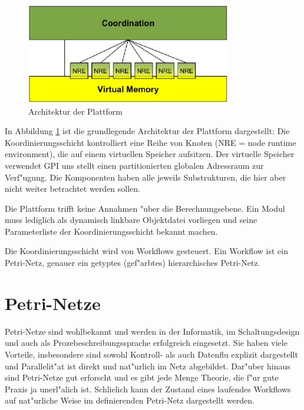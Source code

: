 \documentclass[a4paper,12pt]{article}
\newlength{\st}\setlength{\st}{0pt}
\begin{document}
\begin{figure}
\begin{center}
\includegraphics[width=0.8\textwidth]{architecture.pdf}
\end{center}
\caption{Architektur der Plattform}\label{fig:arch}
\end{figure}

In Abbildung \ref{fig:arch} ist die grundlegende Architektur der
Plattform dargestellt: Die Koordinierungsschicht kontrolliert eine
Reihe von Knoten (NRE = node runtime environment), die auf einem
virtuellen Speicher aufsitzen. Der virtuelle Speicher verwendet GPI
uns stellt einen partitionierten globalen Adressraum zur
Verf"ugung. Die Komponenten haben alle jeweils Substrukturen, die hier
aber nicht weiter betrachtet werden sollen.

Die Plattform trifft keine Annahmen "uber die Berechnungsebene. Ein
Modul muss lediglich als dynamisch linkbare Objektdatei vorliegen und
seine Parameterliste der Koordinierungsschicht bekannt machen.

Die Koordinierungsschicht wird von Workflows gesteuert. Ein Workflow
ist ein Petri-Netz, genauer ein getyptes (gef"arbtes) hierarchisches
Petri-Netz.

\section{Petri-Netze}

Petri-Netze sind wohlbekannt und werden in der Informatik, im
Schaltungsdesign und auch als Proze\3beschreibungssprache erfolgreich
eingesetzt. Sie haben viele Vorteile, insbesondere sind sowohl
Kontroll- als auch Datenflu\3 explizit dargestellt und Parallelit"at
ist direkt und nat"urlich im Netz abgebildet. Dar"uber hinaus sind
Petri-Netze gut erforscht und es gibt jede Menge Theorie, die f"ur
gute Praxis ja unerl"a\3lich ist. Schlie\3lich kann der Zustand eines
laufendes Workflows auf nat"urliche Weise im definierenden Petri-Netz
dargestellt werden.
\end{document}
